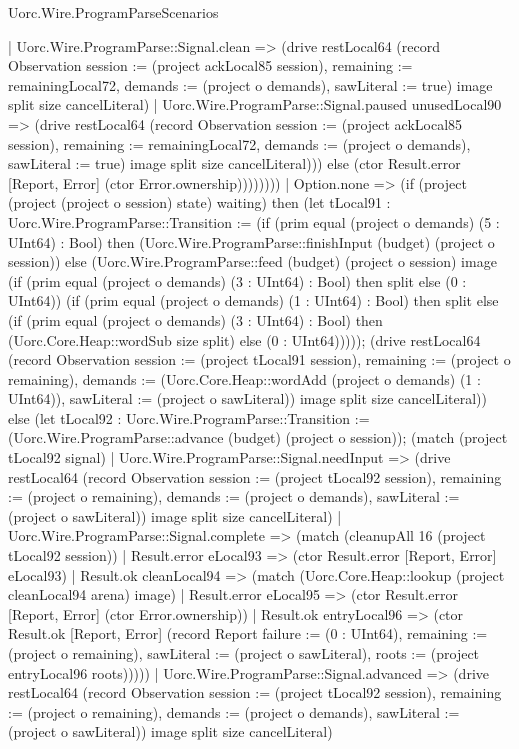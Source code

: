 \begin{lexlean}{Uorc.Wire.ProgramParseScenarios}
\begin{semanticmodule}
{                | Uorc.Wire.ProgramParse::Signal.clean => (drive restLocal64 (record Observation {session := (project ackLocal85 session), remaining := remainingLocal72, demands := (project o demands), sawLiteral := true}) image split size cancelLiteral)
                | Uorc.Wire.ProgramParse::Signal.paused unusedLocal90 => (drive restLocal64 (record Observation {session := (project ackLocal85 session), remaining := remainingLocal72, demands := (project o demands), sawLiteral := true}) image split size cancelLiteral))) else (ctor Result.error [Report, Error] (ctor Error.ownership))))))))
        | Option.none => (if (project (project (project o session) state) waiting) then (let tLocal91 : Uorc.Wire.ProgramParse::Transition := (if (prim equal (project o demands) (5 : UInt64) : Bool) then (Uorc.Wire.ProgramParse::finishInput (budget) (project o session)) else (Uorc.Wire.ProgramParse::feed (budget) (project o session) image (if (prim equal (project o demands) (3 : UInt64) : Bool) then split else (0 : UInt64)) (if (prim equal (project o demands) (1 : UInt64) : Bool) then split else (if (prim equal (project o demands) (3 : UInt64) : Bool) then (Uorc.Core.Heap::wordSub size split) else (0 : UInt64))))); (drive restLocal64 (record Observation {session := (project tLocal91 session), remaining := (project o remaining), demands := (Uorc.Core.Heap::wordAdd (project o demands) (1 : UInt64)), sawLiteral := (project o sawLiteral)}) image split size cancelLiteral)) else (let tLocal92 : Uorc.Wire.ProgramParse::Transition := (Uorc.Wire.ProgramParse::advance (budget) (project o session)); (match (project tLocal92 signal)
          | Uorc.Wire.ProgramParse::Signal.needInput => (drive restLocal64 (record Observation {session := (project tLocal92 session), remaining := (project o remaining), demands := (project o demands), sawLiteral := (project o sawLiteral)}) image split size cancelLiteral)
          | Uorc.Wire.ProgramParse::Signal.complete => (match (cleanupAll 16 (project tLocal92 session))
            | Result.error eLocal93 => (ctor Result.error [Report, Error] eLocal93)
            | Result.ok cleanLocal94 => (match (Uorc.Core.Heap::lookup (project cleanLocal94 arena) image)
              | Result.error eLocal95 => (ctor Result.error [Report, Error] (ctor Error.ownership))
              | Result.ok entryLocal96 => (ctor Result.ok [Report, Error] (record Report {failure := (0 : UInt64), remaining := (project o remaining), sawLiteral := (project o sawLiteral), roots := (project entryLocal96 roots)}))))
          | Uorc.Wire.ProgramParse::Signal.advanced => (drive restLocal64 (record Observation {session := (project tLocal92 session), remaining := (project o remaining), demands := (project o demands), sawLiteral := (project o sawLiteral)}) image split size cancelLiteral)
}
\end{semanticmodule}
\end{lexlean}
